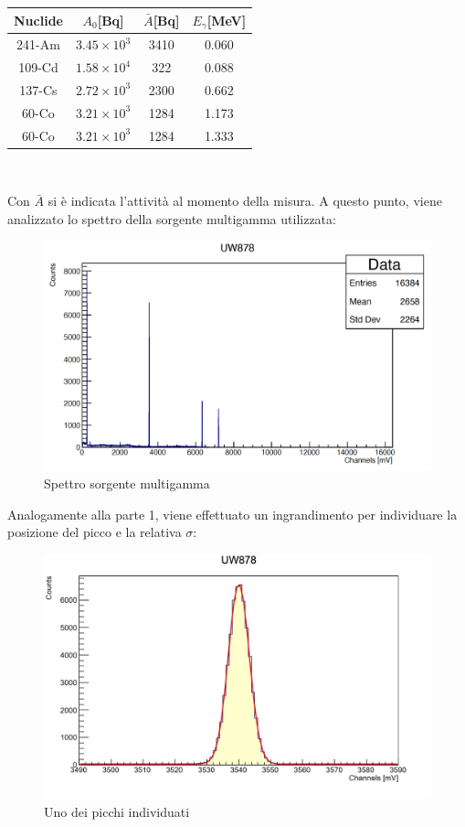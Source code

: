 \documentclass[a4paper,10pt]{article}
\begin{document}
\begin{center}
    \begin{tabular}{cccc}
        \toprule
        Nuclide & $A_{0}$[Bq] & $\bar{A}$[Bq] & $E_{\gamma}$[MeV]\\
        \midrule
         241-Am & $3.45 \times 10^3$ & 3410 & 0.060\\
	  109-Cd & $1.58 \times 10^4$ & 322 & 0.088\\
	  137-Cs & $2.72 \times 10^3$ & 2300 & 0.662\\
	  60-Co & $3.21 \times 10^3$ & 1284 & 1.173\\
	  60-Co & $3.21 \times 10^3$ & 1284 & 1.333\\
        \bottomrule
    \end{tabular}\\
\end{center}

\noindent Con $\bar{A}$ si \`e indicata l'attivit\`a al momento della misura.
\noindent A questo punto, viene analizzato lo spettro della sorgente multigamma utilizzata:

\begin{figure}[H]
    \centering
    \includegraphics[scale=0.6]{grafici/uw878}
    \caption{Spettro sorgente multigamma}
\end{figure}

\noindent Analogamente alla parte 1, viene effettuato un ingrandimento per individuare la posizione del picco e la relativa $\sigma$:

\begin{figure}[H]
    \centering
    \includegraphics[scale=0.6]{grafici/piccouw878}
    \caption{Uno dei picchi individuati}
\end{figure}
\end{document}
